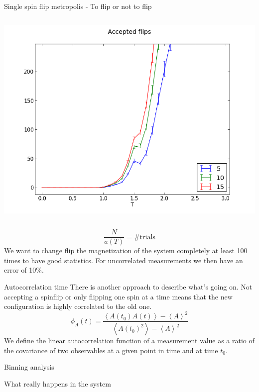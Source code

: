 \documentclass[]{beamer}
\begin{document}
\begin{frame}{Single spin flip metropolis - To flip or not to flip}
\begin{columns}[c]
		\includegraphics[width=\textwidth]{img/single_noAcceptedFlips.png}
\end{columns}
 {\[ \frac{N}{a(T)} = \text{\# trials} \]}
 {We want to change flip the magnetization of the system completely at least 100 times to have good statistics. For uncorrelated measurements we then have an error of 10\%.}
\end{frame}

\begin{frame}{Autocorrelation time}
 {There is another approach to describe what's going on. Not accepting a spinflip or only flipping one spin at a time means that the new configuration is highly correlated to the old one.}
\pause
\[ \phi_{A}(t) = \frac{\left< A(t_0)A(t) \right> - \left< A \right>^2}{\left< A(t_0)^2 \right> - \left< A \right>^2} \]
 {We define the linear autocorrelation function of a measurement value as a ratio of the covariance of two observables at a given point in time and at time \(t_0\).}
\end{frame}

\begin{frame}{Binning analysis}
\end{frame}

\begin{frame}{What really happens in the system}
\end{frame}
\end{document}
